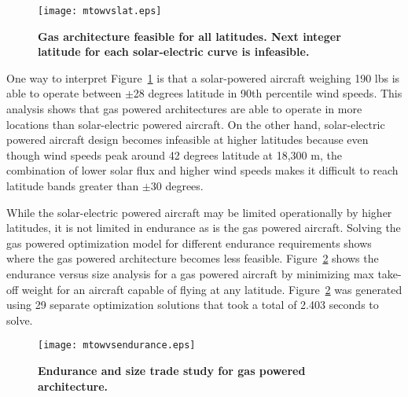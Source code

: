 \begin{figure}[h!]
	\begin{center}
	\texttt{[image: mtowvslat.eps]}
    \caption{\textbf{Gas architecture feasible for all latitudes. Next integer latitude for each solar-electric curve is infeasible.}}
    \label{f:latvsmtowtrade}
	\end{center}
\end{figure}

One way to interpret Figure~\ref{f:latvsmtowtrade} is that a solar-powered aircraft weighing 190 lbs is able to operate between $\pm$28 degrees latitude in 90th percentile wind speeds.  
This analysis shows that gas powered architectures are able to operate in more locations than solar-electric powered aircraft.  
On the other hand, solar-electric powered aircraft design becomes infeasible at higher latitudes because even though wind speeds peak around 42 degrees latitude at 18,300 m, the combination of lower solar flux and higher wind speeds makes it difficult to reach latitude bands greater than $\pm$30 degrees. 

While the solar-electric powered aircraft may be limited operationally by higher latitudes, it is not limited in endurance as is the gas powered aircraft.
Solving the gas powered optimization model for different endurance requirements shows where the gas powered architecture becomes less feasible. 
Figure~\ref{f:mtowvsendurance} shows the endurance versus size analysis for a gas powered aircraft by minimizing max take-off weight for an aircraft capable of flying at any latitude. 
Figure~\ref{f:mtowvsendurance} was generated using 29 separate optimization solutions that took a total of 2.403 seconds to solve.

\begin{figure}[h!]
	\begin{center}
	\texttt{[image: mtowvsendurance.eps]}
    \caption{\textbf{Endurance and size trade study for gas powered architecture.}}
	\label{f:mtowvsendurance}
	\end{center}
\end{figure}

